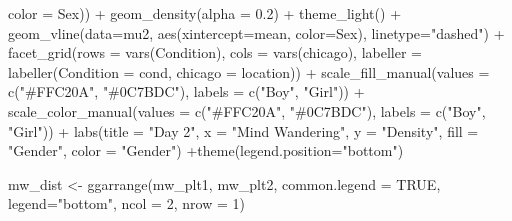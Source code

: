\documentclass[
  letterpaper,
  DIV=11,
  numbers=noendperiod]{scrartcl}
\newenvironment{Shaded}{\begin{snugshade}}{\end{snugshade}}
\newcommand{\AttributeTok}[1]{\textcolor[rgb]{0.49,0.56,0.16}{#1}}
\newcommand{\ConstantTok}[1]{\textcolor[rgb]{0.53,0.00,0.00}{#1}}
\newcommand{\DecValTok}[1]{\textcolor[rgb]{0.25,0.63,0.44}{#1}}
\newcommand{\FloatTok}[1]{\textcolor[rgb]{0.25,0.63,0.44}{#1}}
\newcommand{\FunctionTok}[1]{\textcolor[rgb]{0.02,0.16,0.49}{#1}}
\newcommand{\NormalTok}[1]{\textcolor[rgb]{0.00,0.44,0.13}{#1}}
\newcommand{\OtherTok}[1]{\textcolor[rgb]{0.00,0.44,0.13}{#1}}
\newcommand{\SpecialCharTok}[1]{\textcolor[rgb]{0.25,0.44,0.63}{#1}}
\newcommand{\StringTok}[1]{\textcolor[rgb]{0.25,0.44,0.63}{#1}}
\begin{document}
\begin{Shaded}
\begin{Highlighting}[]
                   \AttributeTok{color =}\NormalTok{ Sex)) }\SpecialCharTok{+}
  \FunctionTok{geom\_density}\NormalTok{(}\AttributeTok{alpha =} \FloatTok{0.2}\NormalTok{) }\SpecialCharTok{+}
  \FunctionTok{theme\_light}\NormalTok{() }\SpecialCharTok{+}
  \FunctionTok{geom\_vline}\NormalTok{(}\AttributeTok{data=}\NormalTok{mu2, }\FunctionTok{aes}\NormalTok{(}\AttributeTok{xintercept=}\NormalTok{mean, }\AttributeTok{color=}\NormalTok{Sex),}
           \AttributeTok{linetype=}\StringTok{"dashed"}\NormalTok{) }\SpecialCharTok{+}
  \FunctionTok{facet\_grid}\NormalTok{(}\AttributeTok{rows =} \FunctionTok{vars}\NormalTok{(Condition),}
             \AttributeTok{cols =} \FunctionTok{vars}\NormalTok{(chicago),}
             \AttributeTok{labeller =} \FunctionTok{labeller}\NormalTok{(}\AttributeTok{Condition =}\NormalTok{ cond,}
                                 \AttributeTok{chicago =}\NormalTok{ location)) }\SpecialCharTok{+}
  \FunctionTok{scale\_fill\_manual}\NormalTok{(}\AttributeTok{values =} \FunctionTok{c}\NormalTok{(}\StringTok{"\#FFC20A"}\NormalTok{, }\StringTok{"\#0C7BDC"}\NormalTok{), }\AttributeTok{labels =} \FunctionTok{c}\NormalTok{(}\StringTok{"Boy"}\NormalTok{, }\StringTok{"Girl"}\NormalTok{)) }\SpecialCharTok{+}
  \FunctionTok{scale\_color\_manual}\NormalTok{(}\AttributeTok{values =} \FunctionTok{c}\NormalTok{(}\StringTok{"\#FFC20A"}\NormalTok{, }\StringTok{"\#0C7BDC"}\NormalTok{), }\AttributeTok{labels =} \FunctionTok{c}\NormalTok{(}\StringTok{"Boy"}\NormalTok{, }\StringTok{"Girl"}\NormalTok{)) }\SpecialCharTok{+}
  \FunctionTok{labs}\NormalTok{(}\AttributeTok{title =} \StringTok{"Day 2"}\NormalTok{,}
    \AttributeTok{x =} \StringTok{"Mind Wandering"}\NormalTok{, }\AttributeTok{y =} \StringTok{"Density"}\NormalTok{,}
       \AttributeTok{fill =} \StringTok{"Gender"}\NormalTok{, }\AttributeTok{color =} \StringTok{"Gender"}\NormalTok{) }\SpecialCharTok{+}\FunctionTok{theme}\NormalTok{(}\AttributeTok{legend.position=}\StringTok{"bottom"}\NormalTok{)}
\end{Highlighting}
\end{Shaded}

\begin{Shaded}
\begin{Highlighting}[]
\NormalTok{mw\_dist }\OtherTok{\textless{}{-}} \FunctionTok{ggarrange}\NormalTok{(mw\_plt1, mw\_plt2, }
          \AttributeTok{common.legend =} \ConstantTok{TRUE}\NormalTok{, }\AttributeTok{legend=}\StringTok{"bottom"}\NormalTok{, }\AttributeTok{ncol =} \DecValTok{2}\NormalTok{, }\AttributeTok{nrow =} \DecValTok{1}\NormalTok{)}
\end{Highlighting}
\end{Shaded}
\end{document}
